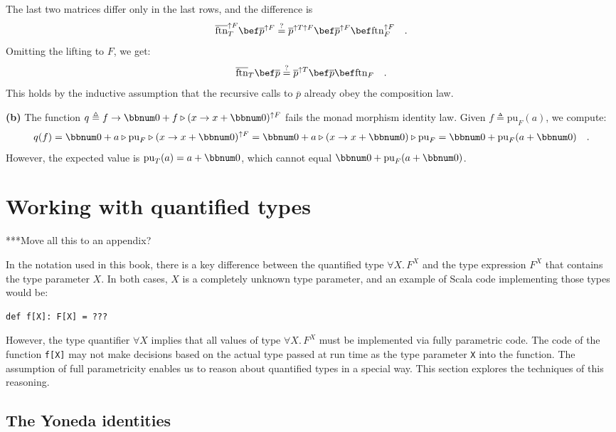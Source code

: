 The last two matrices differ only in the last rows, and the difference
is
\[
\overline{\text{ftn}}_{T}^{\uparrow F}\bef\overline{p}^{\uparrow F}\overset{?}{=}\overline{p}^{\uparrow T\uparrow F}\bef\overline{p}^{\uparrow F}\bef\text{ftn}_{F}^{\uparrow F}\quad.
\]
Omitting the lifting to $F$, we get:
\[
\overline{\text{ftn}}_{T}\bef\overline{p}\overset{?}{=}\overline{p}^{\uparrow T}\bef\overline{p}\bef\text{ftn}_{F}\quad.
\]
This holds by the inductive assumption that the recursive calls to
$\overline{p}$ already obey the composition law.

\textbf{(b)} The function $q\triangleq f\rightarrow\bbnum 0+f\triangleright(x\rightarrow x+\bbnum 0)^{\uparrow F}$
fails the monad morphism identity law. Given $f\triangleq\text{pu}_{F}(a)$,
we compute: 
\[
q(f)=\bbnum 0+a\triangleright\text{pu}_{F}\triangleright(x\rightarrow x+\bbnum 0)^{\uparrow F}=\bbnum 0+a\triangleright(x\rightarrow x+\bbnum 0)\triangleright\text{pu}_{F}=\bbnum 0+\text{pu}_{F}(a+\bbnum 0)\quad.
\]
However, the expected value is $\text{pu}_{T}(a)=a+\bbnum 0$, which
cannot equal  $\bbnum 0+\text{pu}_{F}(a+\bbnum 0)$.

\section{Working with quantified types}

{*}{*}{*}Move all this to an appendix?

In the notation used in this book, there is a key difference between
the quantified type $\forall X.\,F^{X}$ and the type expression $F^{X}$
that contains the type parameter $X$. In both cases, $X$ is a completely
unknown type parameter, and an example of Scala code implementing
those types would be:
\begin{lstlisting}
def f[X]: F[X] = ???
\end{lstlisting}
However, the type quantifier $\forall X$ implies that all values
of type $\forall X.\,F^{X}$ must be implemented via fully parametric
code. The code of the function \lstinline!f[X]!
may not make decisions based on the actual type passed at run time
as the type parameter \lstinline!X!
into the function. The assumption of full parametricity enables us
to reason about quantified types in a special way. This section explores
the techniques of this reasoning.

\subsection{The Yoneda identities}

